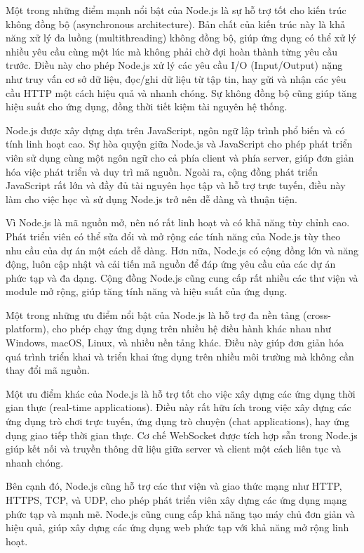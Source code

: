 Một trong những điểm mạnh nổi bật của Node.js là sự hỗ trợ tốt cho kiến trúc không đồng bộ (asynchronous architecture). Bản chất của kiến trúc này là khả năng xử lý đa luồng (multithreading) không đồng bộ, giúp ứng dụng có thể xử lý nhiều yêu cầu cùng một lúc mà không phải chờ đợi hoàn thành từng yêu cầu trước. Điều này cho phép Node.js xử lý các yêu cầu I/O (Input/Output) nặng như truy vấn cơ sở dữ liệu, đọc/ghi dữ liệu từ tập tin, hay gửi và nhận các yêu cầu HTTP một cách hiệu quả và nhanh chóng. Sự không đồng bộ cũng giúp tăng hiệu suất cho ứng dụng, đồng thời tiết kiệm tài nguyên hệ thống.

Node.js được xây dựng dựa trên JavaScript, ngôn ngữ lập trình phổ biến và có tính linh hoạt cao. Sự hòa quyện giữa Node.js và JavaScript cho phép phát triển viên sử dụng cùng một ngôn ngữ cho cả phía client và phía server, giúp đơn giản hóa việc phát triển và duy trì mã nguồn. Ngoài ra, cộng đồng phát triển JavaScript rất lớn và đầy đủ tài nguyên học tập và hỗ trợ trực tuyến, điều này làm cho việc học và sử dụng Node.js trở nên dễ dàng và thuận tiện.

Vì Node.js là mã nguồn mở, nên nó rất linh hoạt và có khả năng tùy chỉnh cao. Phát triển viên có thể sửa đổi và mở rộng các tính năng của Node.js tùy theo nhu cầu của dự án một cách dễ dàng. Hơn nữa, Node.js có cộng đồng lớn và năng động, luôn cập nhật và cải tiến mã nguồn để đáp ứng yêu cầu của các dự án phức tạp và đa dạng. Cộng đồng Node.js cũng cung cấp rất nhiều các thư viện và module mở rộng, giúp tăng tính năng và hiệu suất của ứng dụng.

Một trong những ưu điểm nổi bật của Node.js là hỗ trợ đa nền tảng (cross-platform), cho phép chạy ứng dụng trên nhiều hệ điều hành khác nhau như Windows, macOS, Linux, và nhiều nền tảng khác. Điều này giúp đơn giản hóa quá trình triển khai và triển khai ứng dụng trên nhiều môi trường mà không cần thay đổi mã nguồn.

Một ưu điểm khác của Node.js là hỗ trợ tốt cho việc xây dựng các ứng dụng thời gian thực (real-time applications). Điều này rất hữu ích trong việc xây dựng các ứng dụng trò chơi trực tuyến, ứng dụng trò chuyện (chat applications), hay ứng dụng giao tiếp thời gian thực. Cơ chế WebSocket được tích hợp sẵn trong Node.js giúp kết nối và truyền thông dữ liệu giữa server và client một cách liên tục và nhanh chóng.

Bên cạnh đó, Node.js cũng hỗ trợ các thư viện và giao thức mạng như HTTP, HTTPS, TCP, và UDP, cho phép phát triển viên xây dựng các ứng dụng mạng phức tạp và mạnh mẽ. Node.js cũng cung cấp khả năng tạo máy chủ đơn giản và hiệu quả, giúp xây dựng các ứng dụng web phức tạp với khả năng mở rộng linh hoạt.

